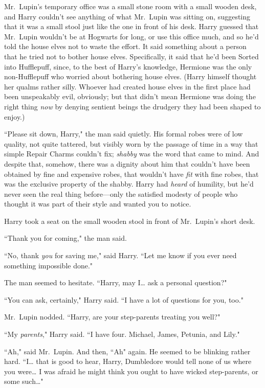 \later

Mr.~Lupin's temporary office was a small stone room with a small wooden desk, and Harry couldn't see anything of what Mr.~Lupin was sitting on, suggesting that it was a small stool just like the one in front of his desk. Harry guessed that Mr.~Lupin wouldn't be at Hogwarts for long, or use this office much, and so he'd told the house elves not to waste the effort. It said something about a person that he tried not to bother house elves. Specifically, it said that he'd been Sorted into Hufflepuff, since, to the best of Harry's knowledge, Hermione was the only non-Hufflepuff who worried about bothering house elves. (Harry himself thought her qualms rather silly. Whoever had created house elves in the first place had been unspeakably evil, obviously; but that didn't mean Hermione was doing the right thing \emph{now} by denying sentient beings the drudgery they had been shaped to enjoy.)

``Please sit down, Harry," the man said quietly. His formal robes were of low quality, not quite tattered, but visibly worn by the passage of time in a way that simple Repair Charms couldn't fix; \emph{shabby} was the word that came to mind. And despite that, somehow, there was a dignity about him that couldn't have been obtained by fine and expensive robes, that wouldn't have \emph{fit} with fine robes, that was the exclusive property of the shabby. Harry had \emph{heard} of humility, but he'd never seen the real thing before---only the satisfied modesty of people who thought it was part of their style and wanted you to notice.

Harry took a seat on the small wooden stool in front of Mr.~Lupin's short desk.

``Thank you for coming," the man said.

``No, thank \emph{you} for saving me," said Harry. ``Let me know if you ever need something impossible done."

The man seemed to hesitate. ``Harry, may I{\ldots} ask a personal question?"

``You can ask, certainly," Harry said. ``I have a lot of questions for you, too."

Mr.~Lupin nodded. ``Harry, are your step-parents treating you well?"

``My \emph{parents}," Harry said. ``I have four. Michael, James, Petunia, and Lily."

``Ah," said Mr.~Lupin. And then, ``Ah" again. He seemed to be blinking rather hard. ``I{\ldots} that is good to hear, Harry, Dumbledore would tell none of us where you were{\ldots} I was afraid he might think you ought to have wicked step-parents, or some such{\ldots}"

